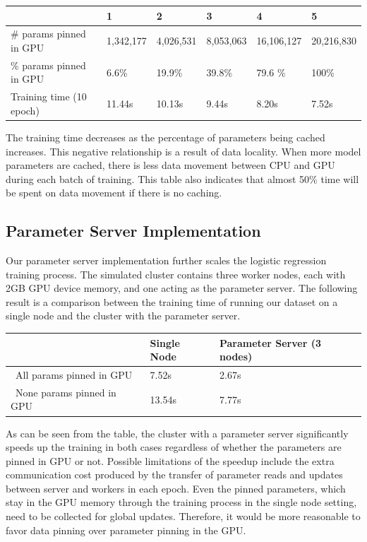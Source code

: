 \documentclass{article}
\begin{document}
\begin{table}[!ht]
    \centering
    \begin{tabular}{|l|l|l|l|l|l|}
    \hline
        \ & 1 & 2 & 3 & 4 & 5 \\ \hline
        \# params pinned in GPU & 1,342,177& 4,026,531 & 8,053,063 & 16,106,127 &20,216,830  \\ \hline
        \% params pinned in GPU & 6.6\% & 19.9\% & 39.8\% & 79.6 \% &100\%  \\ \hline
        Training time (10 epoch) & 11.44s &  10.13s & 9.44s & 8.20s & 7.52s  \\ \hline
    \end{tabular}
\end{table}

The training time decreases as the percentage of parameters being cached increases. This negative relationship is a result of data locality. When more model parameters are cached, there is less data movement between CPU and GPU during each batch of training. This table also indicates that almost 50\% time will be spent on data movement if there is no caching.

\subsection*{Parameter Server Implementation}

Our parameter server implementation further scales the logistic regression training process. The simulated cluster contains three worker nodes, each with 2GB GPU device memory, and one acting as the parameter server. The following result is a comparison between the training time of running our dataset on a single node and the cluster with the parameter server.


\begin{table}[!ht]
    \centering
    \begin{tabular}{|l|l|l|}
    \hline
        \ & Single Node & Parameter Server (3 nodes) \\ \hline
        \ All params pinned in GPU & 7.52s &  2.67s \\ \hline
        \ None params pinned in GPU & 13.54s &  7.77s \\ \hline
    \end{tabular}
\end{table}

As can be seen from the table, the cluster with a parameter server significantly speeds up the training in both cases regardless of whether the parameters are pinned in GPU or not. Possible limitations of the speedup include the extra communication cost produced by the transfer of parameter reads and updates between server and workers in each epoch. Even the pinned parameters, which stay in the GPU memory through the training process in the single node setting, need to be collected for global updates. Therefore, it would be more reasonable to favor data pinning over parameter pinning in the GPU.
\end{document}

